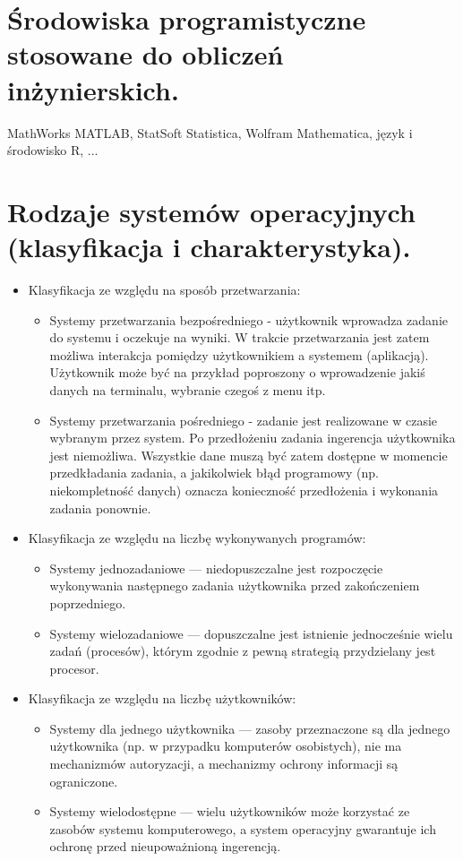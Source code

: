 \documentclass[12pt,a4paper]{article}
\begin{document}
	\section{Środowiska programistyczne stosowane do obliczeń inżynierskich.}
	MathWorks MATLAB, StatSoft Statistica,  Wolfram Mathematica, język i środowisko R, ...

	\section{Rodzaje systemów operacyjnych (klasyfikacja i charakterystyka).}
	\begin{itemize}
		\item Klasyfikacja ze względu na sposób przetwarzania:
		\begin{itemize}
			\item Systemy przetwarzania bezpośredniego - użytkownik wprowadza zadanie do systemu i oczekuje na wyniki. W trakcie przetwarzania jest zatem możliwa interakcja pomiędzy użytkownikiem a systemem (aplikacją). Użytkownik może być na przykład poproszony o wprowadzenie jakiś danych na terminalu, wybranie czegoś z menu itp.
			\item Systemy przetwarzania pośredniego -  zadanie jest realizowane w czasie wybranym przez system. Po przedłożeniu zadania ingerencja użytkownika jest niemożliwa. Wszystkie dane muszą być zatem dostępne w momencie przedkładania zadania, a jakikolwiek błąd programowy (np. niekompletność danych) oznacza konieczność przedłożenia i wykonania zadania ponownie.
		\end{itemize}
	
		\item Klasyfikacja ze względu na liczbę wykonywanych programów:
		\begin{itemize}
			\item  Systemy jednozadaniowe — niedopuszczalne jest rozpoczęcie wykonywania następnego zadania użytkownika przed zakończeniem poprzedniego.
			\item Systemy wielozadaniowe — dopuszczalne jest istnienie jednocześnie wielu zadań (procesów), którym zgodnie z pewną strategią przydzielany jest procesor.
		\end{itemize}
	
		\item Klasyfikacja ze względu na liczbę użytkowników:
		\begin{itemize}
			\item Systemy dla jednego użytkownika — zasoby przeznaczone są dla jednego użytkownika (np. w przypadku komputerów osobistych), nie ma mechanizmów autoryzacji, a mechanizmy ochrony informacji są ograniczone.
			\item Systemy wielodostępne — wielu użytkowników może korzystać ze zasobów systemu komputerowego, a system operacyjny gwarantuje ich ochronę przed nieupoważnioną ingerencją.
		\end{itemize}
	

\end{itemize}
\end{document}
